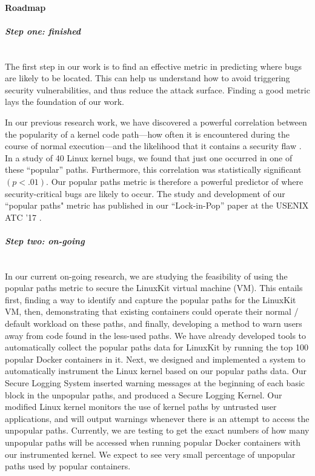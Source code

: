 \paragraph{Roadmap}\mbox{}

\paragraph{\textit{\textbf{Step one: finished}}}\mbox{}\\
The first step in our work is to find an effective metric in predicting where bugs are likely to be located. This can help us understand how to avoid triggering security vulnerabilities, 
and thus reduce the attack surface. Finding a good metric lays the foundation of our work. 

In our previous research work, we have discovered a powerful correlation between the popularity of a kernel code path—how often it is encountered during the course of normal execution—and 
the likelihood that it contains a security flaw \cite{Lock-in-Pop}. In a study of 40 Linux kernel bugs, we found that just one occurred in one of these ``popular'' paths. 
Furthermore, this correlation was statistically significant $(p < .01)$. Our popular paths metric is therefore a powerful predictor of where security-critical bugs are likely to occur. 
The study and development of our ``popular paths" metric has published in our ``Lock-in-Pop'' paper at the USENIX ATC '17 \cite{Lock-in-Pop}.  

\paragraph{\textit{\textbf{Step two: on-going}}}\mbox{}\\
In our current on-going research, we are studying the feasibility of using the popular paths metric to secure the LinuxKit virtual machine (VM). 
This entails first, finding a way to identify and capture the popular paths for the LinuxKit VM, 
then, demonstrating that existing containers could operate their normal / default workload on these paths, 
and finally, developing a method to warn users away from code found in the less-used paths. 
We have already developed tools to automatically collect the popular paths data for LinuxKit by running the top 100 popular Docker containers in it. 
Next, we designed and implemented a system to automatically instrument the Linux kernel based on our popular paths data. Our Secure Logging System inserted warning messages 
at the beginning of each basic block in the unpopular paths, and produced a Secure Logging Kernel. Our modified Linux kernel monitors the use of kernel paths by untrusted user applications, 
and will output warnings whenever there is an attempt to access the unpopular paths. Currently, we are testing to get the exact numbers of how many unpopular paths will be accessed when running 
popular Docker containers with our instrumented kernel. We expect to see very small percentage of unpopular paths used by popular containers. 

